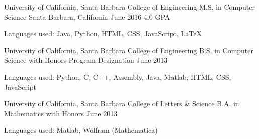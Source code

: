 \begin{cventries}
  \cventry
    {University of California, Santa Barbara \newline College of Engineering}
    {M.S. in Computer Science%
}
    {Santa Barbara, California}
    {June 2016 \newline\vspace{-1mm} 4.0 GPA}
    {
    \begin{cvitems}
	\item {\scriptsize{Languages used: Java, Python, HTML, CSS, JavaScript,  \LaTeX}}
	\end{cvitems}
    }
\cventry
    {University of California, Santa Barbara \newline College of Engineering}
    {B.S. in Computer Science\newline\vspace{-1mm} {\scriptsize \textmd{with Honors Program Designation}}}
    {}
    {June 2013}{
    \begin{cvitems}
	\item {\scriptsize{Languages used: Python, C, C++, Assembly, Java, Matlab, HTML, CSS, JavaScript}}
	\end{cvitems}
}
\cventry
    {University of California, Santa Barbara \newline College of Letters \& Science}
    {B.A. in Mathematics \newline\vspace{-1mm} {\scriptsize \textmd{with Honors}}}
    {    }
    {June 2013}{\begin{cvitems}
	\item {\scriptsize{Languages used: Matlab, Wolfram (Mathematica)}}
	\end{cvitems}}
	
\end{cventries}